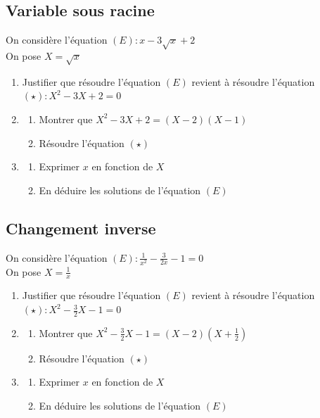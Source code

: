 \documentclass[oneside,12pt]{article}          %
\begin{document}
\subsection{Variable sous racine}
On considère l'équation $(E):x-3\sqrt{x}+2$ \\
On pose $X=\sqrt{x}$
\begin{enumerate}
	\item Justifier que résoudre l'équation $(E)$ revient à résoudre l'équation $(\star):X^2-3X+2=0$
	\item \begin{enumerate}
		\item Montrer que $X^2-3X+2=(X-2)(X-1)$
		\item Résoudre l'équation $(\star)$
	\end{enumerate}
	\item \begin{enumerate}
		\item Exprimer $x$ en fonction de $X$
		\item En déduire les solutions de l'équation $(E)$
	\end{enumerate}
\end{enumerate}



\subsection{Changement inverse}
On considère l'équation $(E):\frac{1}{x^2}-\frac{3}{2x}-1=0$ \\
On pose $X=\frac{1}{x}$
\begin{enumerate}
	\item Justifier que résoudre l'équation $(E)$ revient à résoudre l'équation $(\star):X^2-\frac{3}{2}X-1=0$
	\item \begin{enumerate}
		\item Montrer que $X^2-\frac{3}{2}X-1=(X-2)\left(X+\frac{1}{2}\right)$
		\item Résoudre l'équation $(\star)$
	\end{enumerate}
	\item \begin{enumerate}
		\item Exprimer $x$ en fonction de $X$
		\item En déduire les solutions de l'équation $(E)$
	\end{enumerate}
\end{enumerate}
\end{document}
